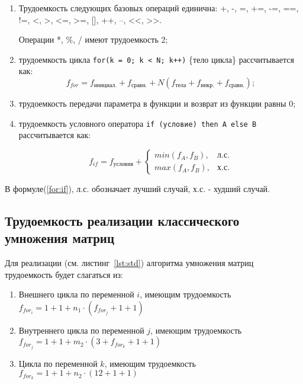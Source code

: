\begin{enumerate}
	
	\item Трудоемкость следующих базовых операций единична:
	+, -, =, +=, -=, ==, !=, <, >, <=, >=, [], ++, --, <<, >>.
	
	Операции *, \%, / имеют трудоемкость 2;
	
	\item трудоемкость цикла \texttt{for(k = 0; k < N; k++)} \{тело цикла\} рассчитывается как:
	\begin{equation}
		\label{for:for}
		f_{for} = f_{\text{инициал.}} + f_{\text{сравн.}} + N(f_{\text{тела}} + f_{\text{инкр.}} + f_{\text{сравн.}});
	\end{equation}
	
	\item трудоемкость передачи параметра в функции и возврат из функции равны 0;
	\item трудоемкость условного оператора \texttt{if (условие) then A else B} рассчитывается как:
	
	\begin{equation}
		\label{for:if}
		f_{if} = f_{\text{условия}} +
		\begin{cases}
			min(f_A, f_B), & \text{л.с.}\\
			max(f_A, f_B), & \text{х.с.}
		\end{cases}
	\end{equation}
	
\end{enumerate}

В формуле(\ref{for:if}), л.с. обозначает лучший случай, х.с. - худший случай.

\subsection{Трудоемкость реализации классического умножения матриц}

Для реализации (см. листинг~\ref{lst:std}) алгоритма умножения матриц трудоемкость будет слагаться из:
\begin{enumerate}
	\item Внешнего цикла по переменной $i$, имеющим трудоемкость $f_{for_i} = 1 + 1 + n_{1}\cdot(f_{for_j} + 1 + 1)$
	\item Внутреннего цикла по переменной $j$, имеющим трудоемкость $f_{for_j} = 1 + 1 + m_{2} \cdot(3 + f_{for_k}+ 1 +1)$
	\item Цикла по переменной $k$, имеющим трудоемкость $f_{for_k} = 1 + 1 + n_{2} \cdot(12  + 1 + 1)$
\end{enumerate}

